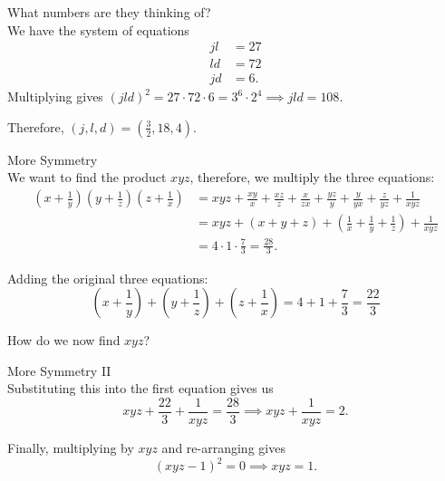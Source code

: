 \documentclass[xcolor=dvipsnames, fontsize=11pt, %
pagesize, %
parskip=half-, t]{beamer}
\begin{document}
\begin{frame}{What numbers are they thinking of?}
	 ~\\
	We have the system of equations \begin{align*} jl &=27 \\ ld&=72 \\ jd&=6. \end{align*}
	Multiplying gives $\left(jl d\right)^2=27\cdot 72\cdot 6=3^6\cdot 2^4\implies jl d=108$. \medskip
	
	Therefore, $(j, l, d)=(\frac32, 18, 4)$.
	
\end{frame}



\begin{frame}{More Symmetry}
	 ~\\
	
We want to find the product $xyz$, therefore, we multiply the three equations: \small \begin{align*}\left(x+\frac{1}{y}\right)\left(y+\frac{1}{z}\right)\left(z+\frac{1}{x}\right)&=xyz+\frac{xy}{x}+\frac{xz}{z}+\frac{x}{zx}+\frac{yz}{y}+\frac{y}{yx}+\frac{z}{yz}+\frac{1}{xyz} \\ &= xyz+\left(x+y+z\right)+\left(\frac{1}{x}+\frac{1}{y}+\frac{1}{z}\right)+\frac{1}{xyz} \\ &= 4\cdot 1 \cdot \frac73=\frac{28}{3}. \end{align*}  \normalsize

Adding the original three equations: $$\left(x+\frac{1}{y}\right)+\left(y+\frac{1}{z}\right)+\left(z+\frac{1}{x}\right)=4+1+\frac{7}{3}=\frac{22}{3}$$

How do we now find $xyz$? 

\end{frame}

\begin{frame}{More Symmetry II}
	 ~\\
Substituting this into the first equation gives us $$xyz+\frac{22}{3}+\frac{1}{xyz}=\frac{28}{3}\implies xyz+\frac{1}{xyz}=2.$$

Finally, multiplying by $xyz$ and re-arranging gives $$(xyz-1)^2=0\implies xyz=\boxed{1}.$$
\end{frame}
\end{document}
